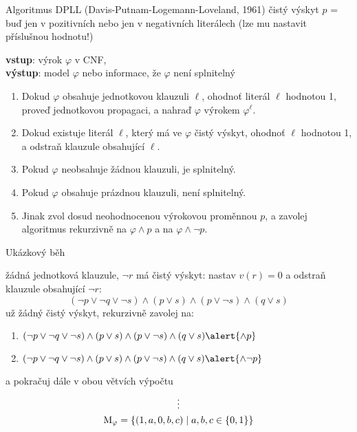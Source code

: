 \documentclass{beamer}
\begin{document}
\begin{frame}{Algoritmus DPLL (Davis-Putnam-Logemann-Loveland, 1961)}
\alert{čistý výskyt} $p$ = buď jen v pozitivních nebo jen v negativních literálech (lze mu nastavit příslušnou hodnotu!)

        \textbf{vstup}: výrok $\varphi$ v CNF,\\ 
        \textbf{výstup}: model $\varphi$ nebo informace, že  $\varphi$ není splnitelný
        \begin{enumerate}                
            \item Dokud $\varphi$ obsahuje jednotkovou klauzuli $\ell$, ohodnoť literál $\ell$ hodnotou 1, proveď \alert{jednotkovou propagaci}, a nahraď $\varphi$ výrokem $\varphi^\ell$.
             \item Dokud existuje literál $\ell$, který má ve $\varphi$ \alert{čistý výskyt}, ohodnoť $\ell$ hodnotou 1, a odstraň klauzule obsahující $\ell$.
            \item Pokud $\varphi$ neobsahuje žádnou klauzuli, je splnitelný.
            \item Pokud $\varphi$ obsahuje prázdnou klauzuli, není splnitelný.
            \item Jinak zvol dosud neohodnocenou výrokovou proměnnou $p$, a \alert{zavolej algoritmus rekurzivně} na $\varphi\land p$ a na $\varphi\land \neg p$.
        \end{enumerate}

\end{frame}


\begin{frame}{Ukázkový běh}

\medskip


žádná jednotková klauzule, $\neg r$ má \alert{čistý výskyt}: nastav  $v(r)=0$ a odstraň klauzule obsahující $\neg r$:
    $$
    (\neg p\lor\neg q\lor\neg s)\land (p\lor s)\land(p\lor\neg s)\land(q\lor s)
    $$
    už žádný čistý výskyt, rekurzivně zavolej na:
    \begin{enumerate}
        \item $(\neg p\lor\neg q\lor\neg s)\land (p\lor s)\land(p\lor\neg s)\land(q\lor s)\alert{\land p}$
        \item $(\neg p\lor\neg q\lor\neg s)\land (p\lor s)\land(p\lor\neg s)\land(q\lor s)\alert{\land \neg p}$
    \end{enumerate}
    a pokračuj dále v obou větvích výpočtu
    \begin{gather*}
        \vdots \\
        \operatorname{M}_\varphi=\{(1,a,0,b,c)\mid a,b,c\in\{0,1\}\}
    \end{gather*}
 
    
\end{frame}
\end{document}
